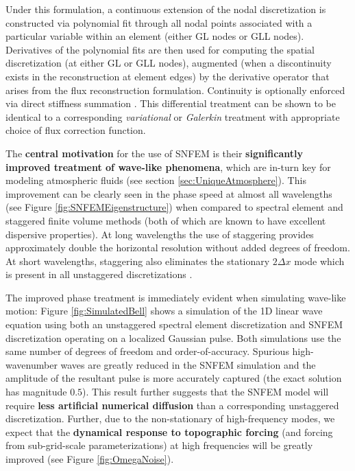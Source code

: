 \documentclass[11pt]{article}
\begin{document}
Under this formulation, a continuous extension of the nodal discretization is constructed via polynomial fit through all nodal points associated with a particular variable within an element (either GL nodes or GLL nodes).  Derivatives of the polynomial fits are then used for computing the spatial discretization (at either GL or GLL nodes), augmented (when a discontinuity exists in the reconstruction at element edges) by the derivative operator that arises from  the flux reconstruction formulation.  Continuity is optionally enforced via direct stiffness summation \cite{ronquist1987spectral}.  This differential treatment can be shown to be identical to a corresponding \textit{variational} or \textit{Galerkin} treatment with appropriate choice of flux correction function.

The \textbf{central motivation} for the use of SNFEM is their \textbf{significantly improved treatment of wave-like phenomena}, which are in-turn key for modeling atmospheric fluids (see section \ref{sec:UniqueAtmosphere}).  This improvement can be clearly seen in the phase speed at almost all wavelengths (see Figure \ref{fig:SNFEMEigenstructure}) when compared to spectral element and staggered finite volume methods (both of which are known to have excellent dispersive properties).  At long wavelengths the use of staggering provides approximately double the horizontal resolution without added degrees of freedom.  At short wavelengths, staggering also eliminates the stationary $2 \Delta x$ mode which is present in all unstaggered discretizations \cite{melvin2012dispersion, ullrich2014understanding}.

The improved phase treatment is immediately evident when simulating wave-like motion:  Figure \ref{fig:SimulatedBell} shows a simulation of the 1D linear wave equation using both an unstaggered spectral element discretization and SNFEM discretization operating on a localized Gaussian pulse.  Both simulations use the same number of degrees of freedom and order-of-accuracy.  Spurious high-wavenumber waves are greatly reduced in the SNFEM simulation and the amplitude of the resultant pulse is more accurately captured (the exact solution has magnitude $0.5$).  This result further suggests that the SNFEM model will require \textbf{less artificial numerical diffusion} than a corresponding unstaggered discretization.  Further, due to the non-stationary of high-frequency modes, we expect that the \textbf{dynamical response to topographic forcing} (and forcing from sub-grid-scale parameterizations) at high frequencies will be greatly improved (see Figure \ref{fig:OmegaNoise}). 
\end{document}
